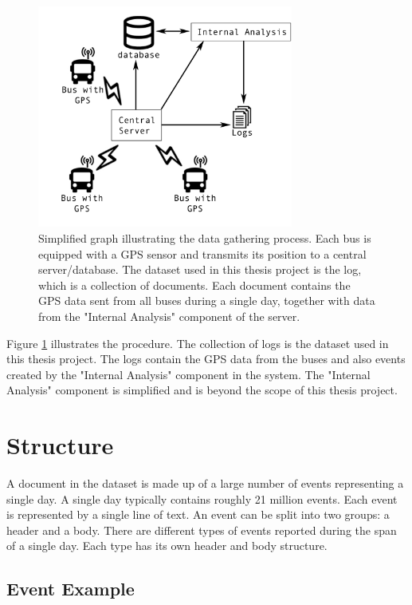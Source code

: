 \begin{figure}
    \centering
    \includegraphics[width=0.75\textwidth]{figures/data-gathering}
    \caption{Simplified graph illustrating the data gathering process. Each bus is equipped with a GPS sensor and transmits its position to a central server/database.
    The dataset used in this thesis project is the log, which is a collection of documents.
    Each document contains the GPS data sent from all buses during a single day, together with data from the "Internal Analysis" component of the server.}
    \label{fig:data-gathering}
\end{figure}

Figure \ref{fig:data-gathering} illustrates the procedure.
The collection of logs is the dataset used in this thesis project.
The logs contain the GPS data from the buses and also events created by the "Internal Analysis" component in the system.
The "Internal Analysis" component is simplified and is beyond the scope of this thesis project.

\section{Structure} \label{sec:data-structure}
A document in the dataset is made up of a large number of events representing a single day.
A single day typically contains roughly 21  million events.  
Each event is represented by a single line of text.
An event can be split into two groups: a header and a body.
There are different types of events reported during the span of a single day.
Each type has its own header and body structure.

\subsection{Event Example}


